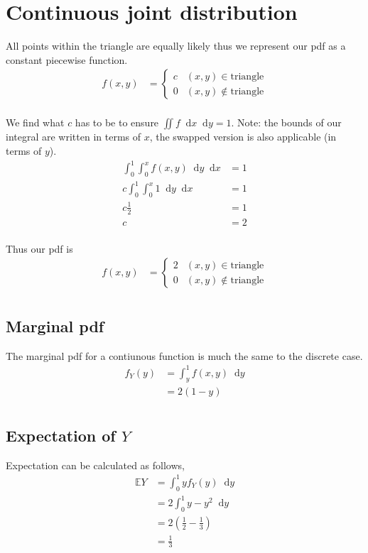 \documentclass{article}
\newcommand{\diff}{\mathop{}\!\mathrm{d}}
\newcommand{\expect}{\mathbb{E}}
\begin{document}
\section{Continuous joint distribution}
All points within the triangle are equally likely thus we represent our
pdf as a constant piecewise function.
\begin{align*}
    f(x,y)
    &=
    \begin{cases}
        c & (x,y) \in \text{triangle} \\
        0 & (x,y) \notin \text{triangle}
    \end{cases} \\
\end{align*}

We find what $c$ has to be to ensure $\iint f \diff x \diff y = 1$.
Note: the bounds of our integral are written in terms of $x$, the swapped
version is also applicable (in terms of $y$).
\begin{align*}
    \int_0^1 \int_0^x f(x,y) \diff y \diff x &= 1 \\
    c \int_0^1 \int_0^x 1 \diff y \diff x &= 1 \\
    c \frac{1}{2} &= 1 \\
    c &= 2 \\
\end{align*}

Thus our pdf is 
\begin{align*}
    f(x,y)
    &=
    \begin{cases}
        2 & (x,y) \in \text{triangle} \\
        0 & (x,y) \notin \text{triangle}
    \end{cases} \\
\end{align*}

\subsection{Marginal pdf}
The marginal pdf for a contiunous function is much the same to the discrete
case.
\begin{align*}
    f_Y(y) &= \int_y^1 f(x,y) \diff y \\
    &= 2(1-y) \\
\end{align*}

\subsection{Expectation of $Y$}
Expectation can be calculated as follows,
\begin{align*}
    \expect Y &= \int_0^1 y f_Y(y) \diff y \\
    &= 2 \int_0^1 y - y^2 \diff y \\
    &= 2 \left(\frac{1}{2} - \frac{1}{3}\right) \\
    &= \frac{1}{3}
\end{align*}
\end{document}
